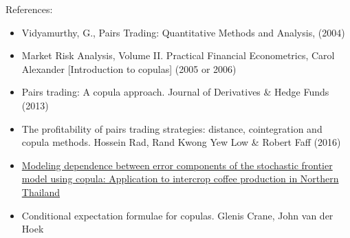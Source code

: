References:
\begin{itemize}
\item Vidyamurthy, G., Pairs Trading: Quantitative Methods and Analysis, (2004)
\item {Market Risk Analysis, Volume II. Practical Financial Econometrics, Carol Alexander [Introduction to copulas]} (2005 or 2006)
\item Pairs trading: A copula approach. Journal of Derivatives \& Hedge Funds (2013)
\item The profitability of pairs trading strategies:
distance, cointegration and copula methods. Hossein Rad, Rand Kwong Yew Low \& Robert Faff (2016)
\item \href{https://hal.science/hal-01294274/document}{Modeling dependence between error components of the stochastic frontier model using copula: Application to intercrop coffee production in Northern Thailand}
\item Conditional expectation formulae for copulas. Glenis Crane, John van der Hoek
\end{itemize}


